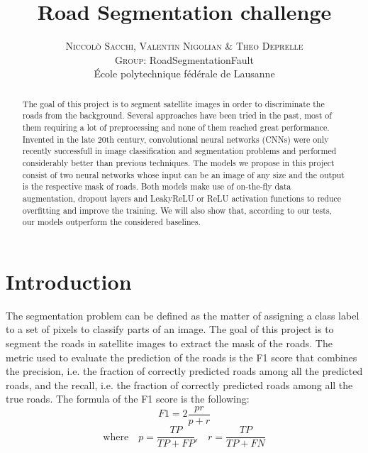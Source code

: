 \documentclass[10pt,conference,compsocconf]{IEEEtran}
\begin{document}
\pretitle{\begin{center}\Huge\bfseries} %
\posttitle{\end{center}} %
\title{Road Segmentation challenge}

\author{
	\textsc{Niccol\`{o} Sacchi, Valentin Nigolian \& Theo Deprelle}
	\normalsize{} \\
	\textsc{Group:}
	\normalsize{RoadSegmentationFault}\\
	\normalsize \'{E}cole polytechnique f\'{e}d\'{e}rale de Lausanne
}

\maketitle

\begin{abstract}
  The goal of this project is to segment satellite images in order to discriminate the roads from the background. Several approaches have been tried in the past, most of them requiring a lot of preprocessing and none of them reached great performance. Invented in the late 20th century, convolutional neural networks (CNNs) were only recently successfull in image classification and segmentation problems and performed considerably better than previous techniques.
  The models we propose in this project consist of two neural networks whose input can be an image of any size and the output is the respective mask of roads. Both models make use of on-the-fly data augmentation, dropout layers and LeakyReLU or ReLU activation functions to reduce overfitting and improve the training. We will also show that, according to our tests, our models outperform the considered baselines.
\end{abstract}

\section{Introduction}
The segmentation problem can be defined as the matter of assigning a class label to a set of pixels to classify parts of an image.
The goal of this project is to segment the roads in satellite images to extract the mask of the roads. The metric used to evaluate the prediction of the roads is the F1 score that combines the precision, i.e. the fraction of correctly predicted roads among all the predicted roads, and the recall, i.e. the fraction of correctly predicted roads among all the true roads. The formula of the F1 score is the following:
$$F1=2\frac{pr}{p+r}$$ $$\textrm{where} \quad p=\frac{TP}{TP+FP} \textrm{,} \quad r=\frac{TP}{TP+FN}$$
\end{document}
